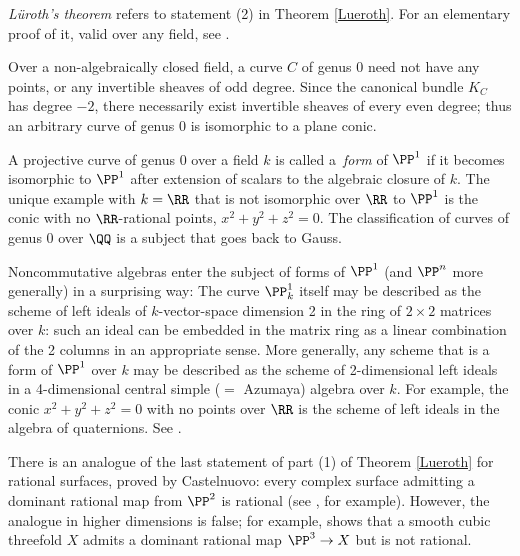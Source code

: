 \begin{fact}
\emph{L\"uroth's theorem} refers to statement (2) in Theorem \ref{Lueroth}.
%
For an elementary proof of it, valid over any
field, see
\cite[Section 8.13]{JacobsonII}.

Over a non-algebraically closed field, a curve $C$ of genus 0 need not have any points, or any invertible sheaves of odd degree. Since the canonical bundle $K_C$ has degree $-2$, there necessarily exist invertible sheaves of every even degree; thus an arbitrary curve of genus 0 is isomorphic to a  plane conic.
%

A projective curve of genus 0 over a field $k$ is called a
\,\emph{form}
%
of $\PP^1$ if it becomes isomorphic to $\PP^1$ after extension
of scalars to
the algebraic closure of $k$. The unique example with $k = \RR$ that
is not isomorphic over $\RR$ to $\PP^1$
is the conic with no $\RR$-rational points, $x^2+y^2+z^2 = 0$.
The classification of curves of genus 0 over $\QQ$ is a subject that goes back to Gauss.



Noncommutative algebras enter the subject of forms of $\PP^1$ (and
$\PP^n$ more generally) in a surprising way: The curve $\PP_k^1$
itself may be described as the scheme of
%
left ideals of $k$-vector-space dimension 2 in the ring of
$2\times 2$ matrices over $k$: such an ideal can be embedded in the
matrix ring as a linear combination of the 2 columns in an appropriate sense.
More generally, any scheme that is a form of $\PP^1$ over $k$
may be described as the scheme of 2-dimensional left ideals in a
4-dimensional central simple ($=$
Azumaya) algebra
%
over $k$. For example, the
conic $x^2+y^2+z^2 = 0$ with no points over $\RR$ is the scheme of
left ideals in the algebra of
quaternions.
%
See \cite[Section X.6]{Serre1979}.

 There is an analogue
of the last statement of part (1) of Theorem \ref{Lueroth}
for rational surfaces,
proved
by
%
Castelnuovo: every complex surface admitting a dominant rational
map from $\PP^2$ is rational (see \cite[Corollary V.5]{Beauville}, for
example).
However, the analogue in higher
dimensions
is false; for example, \cite{MR0302652} shows that a smooth cubic threefold $X$ admits a dominant rational map $\PP^3 \to X$ but is not rational.

\end{fact}

